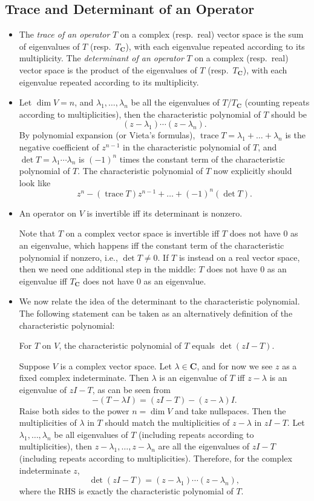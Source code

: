 \documentclass[11pt]{article}
\newcommand{\df}[1]{\textit{\textsf{#1}}}
\newcommand{\C}{\mathbf{C}}
\renewcommand{\d}{\dim}
\newcommand{\tr}{\operatorname{trace}}
\begin{document}
\subsection{Trace and Determinant of an Operator}
\begin{itemize}
    \item The \df{trace of an operator} $T$ on a complex (resp.\ real) vector space is the sum of eigenvalues of $T$ (resp.\ $T_\C$), with each eigenvalue repeated according to its multiplicity. The \df{determinant of an operator} $T$ on a complex (resp.\ real) vector space is the product of the eigenvalues of $T$ (resp.\ $T_\C$), with each eigenvalue repeated according to its multiplicity.
    \item Let $\d V = n$, and $\lambda_1,\dots,\lambda_n$ be all the eigenvalues of $T$/$T_\C$ (counting repeats according to multiplicities), then the characteristic polynomial of $T$ should be \[(z-\lambda_1)\cdots(z-\lambda_n).\] By polynomial expansion (or Vieta's formulas), $\tr T = \lambda_1 +\dots+\lambda_n$ is the negative coefficient of $z^{n-1}$ in the characteristic polynomial of $T$, and $\det T = \lambda_1 \cdots \lambda_n$ is $(-1)^n$ times the constant term of the characteristic polynomial of $T$. The characteristic polynomial of $T$ now explicitly should look like \[z^n - (\tr T) z^{n-1} + \dots + (-1)^n (\det T).\]
    \item An operator on $V$ is invertible iff its determinant is nonzero.
    
    Note that $T$ on a complex vector space is invertible iff $T$ does not have 0 as an eigenvalue, which happens iff the constant term of the characteristic polynomial if nonzero, i.e., $\det T \neq 0$. If $T$ is instead on a real vector space, then we need one additional step in the middle: $T$ does not have 0 as an eigenvalue iff $T_\C$ does not have 0 as an eigenvalue.
    \item We now relate the idea of the determinant to the characteristic polynomial. The following statement can be taken as an alternatively definition of the characteristic polynomial: 
    \begin{center}
        For $T$ on $V$, the characteristic polynomial of $T$ equals $\det(zI - T)$.
    \end{center}
    
    Suppose $V$ is a complex vector space. Let $\lambda \in \C$, and for now we see $z$ as a fixed complex indeterminate. Then $\lambda$ is an eigenvalue of $T$ iff $z-\lambda$ is an eigenvalue of $zI - T$, as can be seen from \[-(T - \lambda I) = (zI-T) - (z-\lambda)I.\] Raise both sides to the power $n = \d V$ and take nullspaces. Then the multiplicities of $\lambda$ in $T$ should match the multiplicities of $z-\lambda$ in $zI - T$. Let $\lambda_1,\dots,\lambda_n$ be all eigenvalues of $T$ (including repeats according to multiplicities), then $z - \lambda_1, \dots,z - \lambda_n$ are all the eigenvalues of $zI - T$ (including repeats according to multiplicities). Therefore, for the complex indeterminate $z$, \[\det(zI - T) = (z - \lambda_1)\cdots(z-\lambda_n),\] where the RHS is exactly the characteristic polynomial of $T$.
    

\end{itemize}
\end{document}
